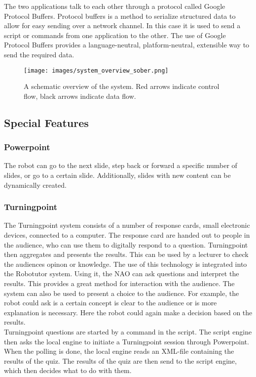 The two applications talk to each other through a protocol called Google Protocol Buffers. Protocol buffers is a method to serialize structured data to allow for easy sending over a network channel. In this case it is used to send a script or commands from one application to the other. The use of  Google Protocol Buffers provides a language-neutral, platform-neutral, extensible way to send the required data. \

\begin{figure}
	\texttt{[image: images/system\_overview\_sober.png]}
	\caption{A schematic overview of the system. Red arrows indicate control flow, black arrows indicate data flow.}
\end{figure}

\subsection{Special Features}
\subsubsection{Powerpoint}
The robot can go to the next slide, step back or forward a specific number of slides, or go to a certain slide. Additionally, slides with new content can be dynamically created.

\subsubsection{Turningpoint}
The Turningpoint system consists of a number of response cards, small electronic devices, connected to a computer. The response card are handed out to people in the audience, who can use them to digitally respond to a question. Turningpoint then aggregates and presents the results. This can be used by a lecturer to check the audiences opinon or knowledge. The use of this technology is integrated into the Robotutor system. Using it, the NAO can ask questions and interpret the results. This provides a great method for interaction with the audience.
The system can also be used to present a choice to the audience. For example, the robot could ask is a certain concept is clear to the audience or is more explanation is necessary. Here the robot could again make a decision based on the results.\\

Turningpoint questions are started by a command in the script. The script engine then asks the local engine to initiate a Turningpoint session through Powerpoint. When the polling is done, the local engine reads an XML-file containing the results of the quiz. The results of the quiz are then send to the script engine, which then decides what to do with them.

